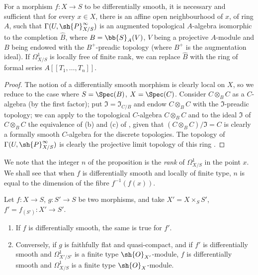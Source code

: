 \begin{proposition}[16.10.3]
\label{IV.16.10.3}
For a morphism $f:X \to S$ to be differentially smooth, it is necessary and sufficient that for every $x \in X$, there is an affine open neighbourhood of $x$, of ring $A$, such that $\Gamma(U, \sh{P}_{X/S}^\infty)$ is an augmented topological $A$-algebra isomorphic to the completion $\widehat{B}$, where $B = \bb{S}_A(V)$, $V$ being a projective $A$-module and $B$ being endowed with the $B^+$-preadic topology (where $B^+$ is the augmentation ideal).
If $\Omega_{X/S}^1$ is locally free of finite rank, we can replace $\widehat{B}$ with the ring of formal series $A[[T_1, \dots, T_n]]$.
\end{proposition}

\begin{proof}
The notion of a differentially smooth morphism is clearly local on $X$, so we reduce to the case where $S = \Spec(B)$, $X = \Spec(C)$.
Consider $C \otimes_B C$ as a $C$-algebra (by the first factor);
put $\mathfrak{I} = \mathfrak{I}_{C/B}$ and endow $C \otimes_B C$ with the $\mathfrak{I}$-preadic topology;
we can apply to the topological $C$-algebra $C \otimes_B C$ and to the ideal $\mathfrak{I}$ of $C \otimes_B C$ the equivalence of (b) and (c) of , given that $(C \otimes_B C)/\mathfrak{I} = C$ is clearly a formally smooth $C$-algebra for the discrete topologies.
The topology of $\Gamma(U, \sh{P}_{X/S}^\infty)$ is clearly the projective limit topology of this ring .
\end{proof}

We note that the integer $n$ of the proposition  is the \emph{rank} of $\Omega_{X/S}^1$ in the point $x$.
We shall see  that when $f$ is differentially smooth and locally of finite type, $n$ is equal to the dimension of the fibre $f^{-1}(f(x))$. 

\begin{proposition}[16.10.4]
\label{IV.16.10.4}
Let $f:X \to S$, $g:S' \to S$ be two morphisms, and take $X' = X \times_S S'$, $f' = f_{(S')}:X' \to S'$.
\begin{enumerate}
  \item[\rm{(i)}] If $f$ is differentially smooth, the same is true for $f'$. 
  \item[\rm{(ii)}] Conversely, if $g$ is faithfully flat and quasi-compact, and if $f'$ is differentially smooth and $\Omega_{X'/S'}^1$ is a finite type $\sh{O}_{X'}$-module, $f$ is differentially smooth and $\Omega_{X/S}^1$ is a finite type $\sh{O}_X$-module.
\end{enumerate}
\end{proposition}

